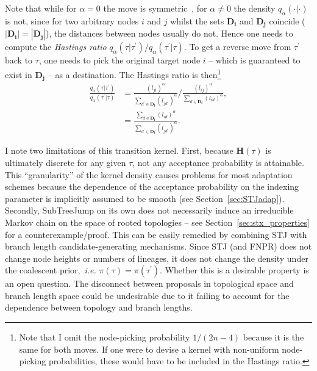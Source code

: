 Note that while for $\alpha = 0$ the move is symmetric~\citep{Hoehna2008}, for $\alpha \neq 0$ the density $q_{\alpha}(\cdot|\cdot)$ is not, since for two arbitrary nodes $i$ and $j$  whilst the sets $\mathbf{D_i}$ and $\mathbf{D_j}$ coincide ($|\mathbf{D_i}| = |\mathbf{D_j}|$), the distances between nodes usually do not.
Hence one needs to compute the \textit{Hastings ratio} $q_{\alpha}(\tau|\tau^\prime)/q_{\alpha}(\tau^\prime|\tau)$.
To get a reverse move from $\tau^\prime$ back to $\tau$, one needs to pick the original target node $i$  -- which is guaranteed to exist in $\mathbf{D_j}$ -- as a destination. 
The Hastings ratio is then\footnote{Note that I omit the node-picking probability $1/(2n-4)$ because it is the same for both moves. If one were to devise a kernel with non-uniform node-picking probabilities, these would have to be included in the Hastings ratio.}
\begin{align}
 \frac{q_{\alpha}(\tau| \tau^\prime)}{q_{\alpha}(\tau^\prime| \tau) }  &= \frac{(l_{ji})^{\alpha}}{\sum_{d^\prime \in \mathbf{D_j}}(l_{jd^\prime})^{\alpha}} /\frac{(l_{ij})^{\alpha}}{\sum_{d \in \mathbf{D_i}}(l_{id})^{\alpha}}, \nonumber \\
 &  = \frac{\sum_{d \in \mathbf{D_i}}(l_{id})^{\alpha}}{\sum_{d^\prime \in \mathbf{D_j}}(l_{jd^\prime})^{\alpha}}.
\end{align}

I note two limitations of this transition kernel.
First, because $\mathbf{H}(\tau)$ is ultimately discrete for any given $\tau$, not any acceptance probability is attainable.
This ``granularity'' of the kernel density causes problems for most adaptation schemes because the dependence of the acceptance probability on the indexing parameter is implicitly assumed to be smooth (see Section~\ref{sec:STJadap}).
Secondly, SubTreeJump on its own does not necessarily induce an irreducible Markov chain on the space of rooted topologies  -- see Section~\ref{sec:stx_properties} for a counterexample/proof.
This can be easily remedied by combining STJ with branch length candidate-generating mechanisms.
Since STJ  (and FNPR) does not change node heights or numbers of lineages, it does not change the density under the coalescent prior,~\textit{i.e.} $\pi(\tau) = \pi(\tau^\prime)$.
Whether this is a desirable property is an open question.
The disconnect between proposals in topological space and branch length space could be undesirable due to it failing to account for the dependence between topology and branch lengths.

